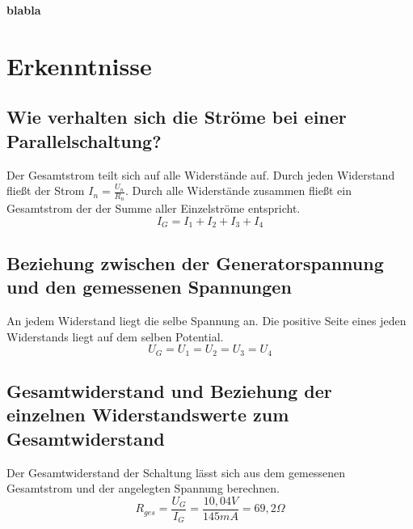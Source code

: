 \documentclass[
a4paper,     %
 headsepline, %
11pt         %
]{scrartcl}  %
\begin{document}
\textbf{blabla}

\section{Erkenntnisse}

\subsection{Wie verhalten sich die Ströme bei einer Parallelschaltung?}
Der Gesamtstrom teilt sich auf alle Widerstände auf. Durch jeden Widerstand fließt der Strom $I_n=\frac{U_n}{R_n}$.
Durch alle Widerstände zusammen fließt ein Gesamtstrom der der Summe aller Einzelströme entspricht.
\[I_G = I_1 + I_2 + I_3 + I_4\]

\subsection{Beziehung zwischen der Generatorspannung und den gemessenen Spannungen}
An jedem Widerstand liegt die selbe Spannung an. Die positive Seite eines jeden Widerstands liegt auf dem selben Potential.
\[U_G=U_1=U_2=U_3=U_4\]

\subsection{Gesamtwiderstand und Beziehung der einzelnen Widerstandswerte zum Gesamtwiderstand}
Der Gesamtwiderstand der Schaltung lässt sich aus dem gemessenen Gesamtstrom und der angelegten Spannung berechnen.
\[R_{ges} = \frac{U_G}{I_G} = \frac{10,04V}{145mA}= 69,2\Omega\]
\end{document}
